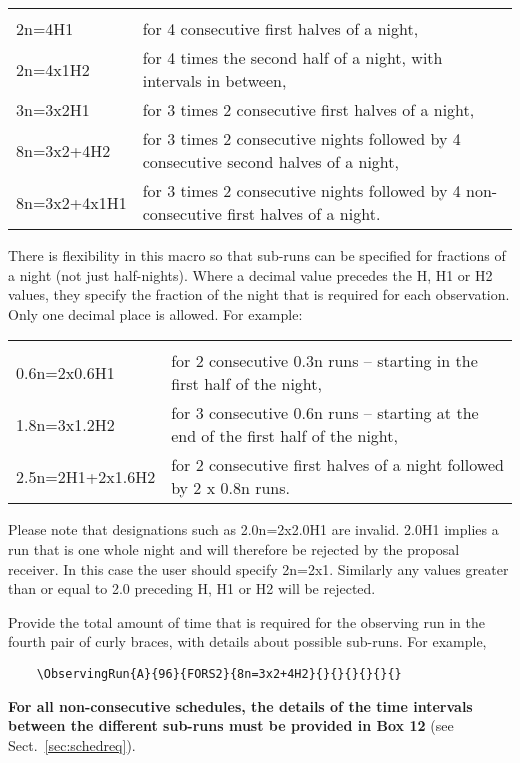 \documentclass{article}
\begin{document}
\begin{tabular}{ll}
& \\
2n=4H1     & for 4 consecutive first halves of a night, \\
2n=4x1H2   & for 4 times the second half of a night, with intervals in between,\\   
3n=3x2H1  & for 3 times 2 consecutive first halves of a night, \\   
8n=3x2+4H2& for 3 times 2 consecutive nights followed by 4 consecutive second halves of a night, \\
8n=3x2+4x1H1& for 3 times 2 consecutive nights followed by 4 non-consecutive first halves of a night. \\
\end{tabular}

\bigskip

There is flexibility in this macro so that sub-runs
can be specified for fractions of a night  (not just half-nights).
Where a decimal value precedes the H, H1 or H2 values, they specify the
fraction of the night that is required for each observation. Only
one decimal place is allowed.
For example:

\begin{tabular}{ll}
& \\
0.6n=2x0.6H1     & for 2 consecutive 0.3n runs -- starting in the first half of the night, \\
1.8n=3x1.2H2    & for  3 consecutive 0.6n runs -- starting at the end of the first half of the night, \\
2.5n=2H1+2x1.6H2 & for 2 consecutive first halves of a night followed by 2 x 0.8n runs.\\
\end{tabular}

Please note that designations such as 2.0n=2x2.0H1 are invalid. 2.0H1 implies a run that is one whole night and will therefore be rejected by the proposal receiver.
In this case the user should specify 2n=2x1.
Similarly any values greater than or equal to 2.0 preceding
H, H1 or H2 will be rejected.

\bigskip

Provide the total amount of time
that is required for the observing run in the fourth pair of curly braces, with details about
possible sub-runs.  For example,

\begin{verbatim}
    \ObservingRun{A}{96}{FORS2}{8n=3x2+4H2}{}{}{}{}{}{}
\end{verbatim}
{\bf For all non-consecutive schedules, the details of the time
  intervals between the different sub-runs must be provided in Box
  12} (see Sect.~\ref{sec:schedreq}). \\
\end{document}
